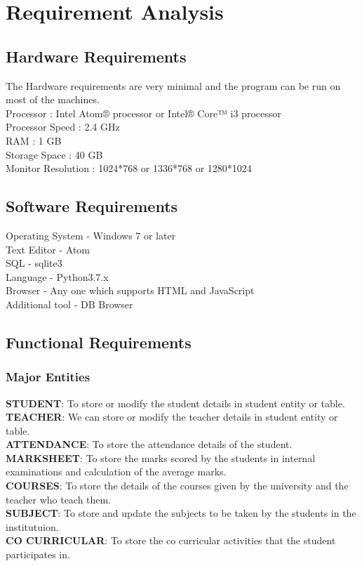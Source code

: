 \chapter{Requirement Analysis}

\section{Hardware Requirements}
The Hardware requirements are very minimal and the program can be run on most of
the machines. \\
Processor : Intel Atom® processor or Intel® Core™ i3 processor\\
Processor Speed : 2.4 GHz\\
RAM : 1 GB\\
Storage Space : 40 GB\\
Monitor Resolution : 1024*768 or 1336*768 or 1280*1024\\
\thispagestyle{fancy}

\section{Software Requirements}
Operating System - Windows 7 or later\\
Text Editor - Atom\\
SQL - sqlite3\\
Language - Python3.7.x\\
Browser - Any one which supports HTML and JavaScript\\
Additional tool - DB Browser\\
\thispagestyle{fancy}
\pagebreak
\section{Functional Requirements}
\subsection{Major Entities}
\textbf{STUDENT}: To store or modify the student details in student entity or table.\\
\textbf{TEACHER}: We can store or modify the teacher details in student entity or table.\\
\textbf{ATTENDANCE}: To store the attendance details of the student.\\
\textbf{MARKSHEET}: To store the marks scored by the students in internal examinations and calculation of the average marks.\\
\textbf{COURSES}: To store the details of the courses given by the university and the teacher who teach them.\\
\textbf{SUBJECT}: To store and update the subjects to be taken by the students in the institutuion.\\
\textbf{CO CURRICULAR}: To store the co curricular activities that the student participates in.\\


